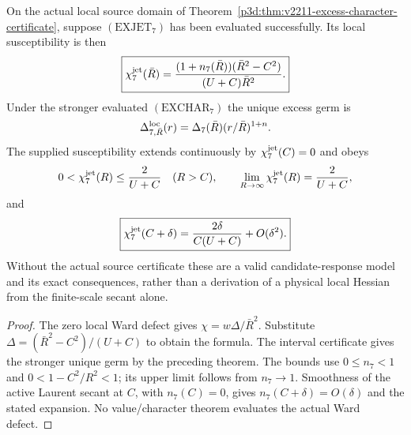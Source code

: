 \documentclass[12pt,a4paper]{article}
\begin{document}
\begin{theorem}
\label{p3d:thm:v173-fixed-depth-laurent-excess-jet}
On the actual local source domain of
Theorem~\ref{p3d:thm:v2211-excess-character-certificate}, suppose
$(\mathrm{EXJET}_7)$ has been evaluated successfully. Its local
susceptibility is then
\begin{equation}
\label{p3d:eq:v173-n7-local-susceptibility}
 \boxed{\chi_7^{\rm jet}(\bar R)
 =\frac{(1+n_7(\bar R))(\bar R^2-C^2)}{(U+C)\bar R^2}.}
\end{equation}
Under the stronger evaluated $(\mathrm{EXCHAR}_7)$ the unique excess germ
is
\[
 \Delta^{\rm loc}_{7,\bar R}(r)
 =\Delta_7(\bar R)(r/\bar R)^{1+n}.
\]
The supplied susceptibility extends continuously by $\chi_7^{\rm jet}(C)=0$
and obeys
\[
 0<\chi_7^{\rm jet}(R)\le\frac2{U+C}\quad(R>C),\qquad
 \lim_{R\to\infty}\chi_7^{\rm jet}(R)=\frac2{U+C},
\]
and
\begin{equation}
\label{p3d:eq:v173-n7-terminal-jet}
 \boxed{\chi_7^{\rm jet}(C+\delta)
 =\frac{2\delta}{C(U+C)}+O(\delta^2).}
\end{equation}
Without the actual source certificate these are a valid candidate-response
model and its exact consequences, rather than a derivation of a physical
local Hessian from the finite-scale secant alone.
\end{theorem}
\begin{proof}
The zero local Ward defect gives $\chi=w\Delta/\bar R^2$.
Substitute $\Delta=(\bar R^2-C^2)/(U+C)$ to obtain the formula.
The interval certificate gives the stronger unique germ by the preceding
theorem. The bounds use $0\le n_7<1$ and $0<1-C^2/R^2<1$; its upper
limit follows from $n_7\to1$. Smoothness of the active Laurent secant at
$C$, with $n_7(C)=0$, gives $n_7(C+\delta)=O(\delta)$ and the stated
expansion. No value/character theorem evaluates the actual Ward defect.
\end{proof}
\end{document}
